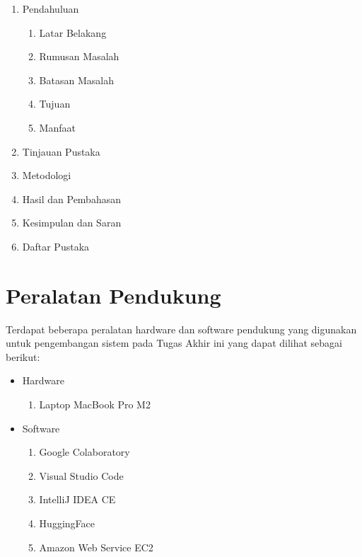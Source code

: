 \begin{itemize}[topsep=0pt]
  \begin{enumerate}[topsep=0pt]
    \item Pendahuluan
    \begin{enumerate}[topsep=0pt]
      \item Latar Belakang
      \item Rumusan Masalah
      \item Batasan Masalah
      \item Tujuan
      \item Manfaat
    \end{enumerate}
    \item Tinjauan Pustaka
    \item Metodologi
    \item Hasil dan Pembahasan
    \item Kesimpulan dan Saran
    \item Daftar Pustaka
  \end{enumerate}
\end{itemize}

\section{Peralatan Pendukung}
\label{sec:peralatan pendukung}

Terdapat beberapa peralatan hardware dan software pendukung yang digunakan untuk pengembangan sistem pada Tugas Akhir ini yang dapat dilihat sebagai berikut:
\begin{itemize}[topsep=0pt]
  \item Hardware
  \begin{enumerate}[topsep=0pt]
    \item Laptop MacBook Pro M2
  \end{enumerate}
  \item Software
  \begin{enumerate}[topsep=0pt]
    \item Google Colaboratory
    \item Visual Studio Code
    \item IntelliJ IDEA CE
    \item HuggingFace
    \item Amazon Web Service EC2
  \end{enumerate}
\end{itemize}
